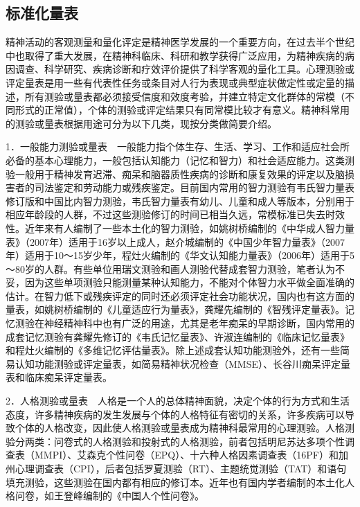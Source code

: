 \subsection{标准化量表}

精神活动的客观测量和量化评定是精神医学发展的一个重要方向，在过去半个世纪中也取得了重大发展，在精神科临床、科研和教学获得广泛应用，为精神疾病的病因调查、科学研究、疾病诊断和疗效评价提供了科学客观的量化工具。心理测验或评定量表是用一些有代表性任务或条目对人行为表现或典型症状做定性或定量的描述，所有测验或量表都必须接受信度和效度考验，并建立特定文化群体的常模（不同形式的正常值），个体的测验或评定结果只有同常模比较才有意义。精神科常用的测验或量表根据用途可分为以下几类，现按分类做简要介绍。

1．一般能力测验或量表　一般能力指个体生存、生活、学习、工作和适应社会所必备的基本心理能力，一般包括认知能力（记忆和智力）和社会适应能力。这类测验一般用于精神发育迟滞、痴呆和脑器质性疾病的诊断和康复效果的评定以及脑损害者的司法鉴定和劳动能力或残疾鉴定。目前国内常用的智力测验有韦氏智力量表修订版和中国比内智力测验，韦氏智力量表有幼儿、儿童和成人等版本，分别用于相应年龄段的人群，不过这些测验修订的时间已相当久远，常模标准已失去时效性。近年来有人编制了一些本土化的智力测验，如姚树桥编制的《中华成人智力量表》（2007年）适用于16岁以上成人，赵介城编制的《中国少年智力量表》（2007年）适用于10～15岁少年，程灶火编制的《华文认知能力量表》（2006年）适用于5～80岁的人群。有些单位用瑞文测验和画人测验代替成套智力测验，笔者认为不妥，因为这些单项测验只能测量某种认知能力，不能对个体智力水平做全面准确的估计。在智力低下或残疾评定的同时还必须评定社会功能状况，国内也有这方面的量表，如姚树桥编制的《儿童适应行为量表》，龚耀先编制的《智残评定量表》。记忆测验在神经精神科中也有广泛的用途，尤其是老年痴呆的早期诊断，国内常用的成套记忆测验有龚耀先修订的《韦氏记忆量表》、许淑连编制的《临床记忆量表》和程灶火编制的《多维记忆评估量表》。除上述成套认知功能测验外，还有一些简易认知功能测验或评定量表，如简易精神状况检查（MMSE）、长谷川痴呆评定量表和临床痴呆评定量表。

2．人格测验或量表　人格是一个人的总体精神面貌，决定个体的行为方式和生活态度，许多精神疾病的发生发展与个体的人格特征有密切的关系，许多疾病可以导致个体的人格改变，因此使人格测验或量表成为精神科最常用的心理测验。人格测验分两类：问卷式的人格测验和投射式的人格测验，前者包括明尼苏达多项个性调查表（MMPI）、艾森克个性问卷（EPQ）、十六种人格因素调查表（16PF）和加州心理调查表（CPI），后者包括罗夏测验（RT）、主题统觉测验（TAT）和语句填充测验，这些测验在国内都有相应的修订本。近年也有国内学者编制的本土化人格问卷，如王登峰编制的《中国人个性问卷》。

